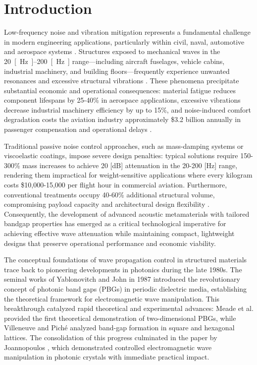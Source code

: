 \documentclass[review,numbers,sort&compress]{elsarticle}
\begin{document}
\section{Introduction}\label{intro}
Low-frequency noise and vibration mitigation represents a fundamental challenge in modern engineering applications, particularly within civil, naval, automotive and aerospace systems \cite{MIR2022108936, KANDASAMY2016279, RAO2003457, MASRI2024102957, Matlack2016, An2020, Comandini2024}. Structures exposed to mechanical waves in the \SIrange{20}{200}{[\hertz]} range---including aircraft fuselages, vehicle cabins, industrial machinery, and building floors---frequently experience unwanted resonances and excessive structural vibrations \cite{Lin2021, d2019fractal}. These phenomena precipitate substantial economic and operational consequences: material fatigue reduces component lifespans by 25-40\% in aerospace applications, excessive vibrations decrease industrial machinery efficiency by up to 15\%, and noise-induced comfort degradation costs the aviation industry approximately \$3.2 billion annually in passenger compensation and operational delays \cite{Hussein2014, Kinsler2000}. 

Traditional passive noise control approaches, such as mass-damping systems or viscoelastic coatings, impose severe design penalties: typical solutions require 150-300\% mass increases to achieve 20 [dB] attenuation in the 20-200 [Hz] range, rendering them impractical for weight-sensitive applications where every kilogram costs \$10,000-15,000 per flight hour in commercial aviation. Furthermore, conventional treatments occupy 40-60\% additional structural volume, compromising payload capacity and architectural design flexibility \cite{cryst10080686, Weiner2020,LU20131,Li2012}. Consequently, the development of advanced acoustic metamaterials with tailored bandgap properties has emerged as a critical technological imperative for achieving effective wave attenuation while maintaining compact, lightweight designs that preserve operational performance and economic viability.


The conceptual foundations of wave propagation control in structured materials trace back to pioneering developments in photonics during the late 1980s. The seminal works of Yablonovitch and John in 1987 \cite{Yablonovitch1987, John1987} introduced the revolutionary concept of photonic band gaps (PBGs) in periodic dielectric media, establishing the theoretical framework for electromagnetic wave manipulation. This breakthrough catalyzed rapid theoretical and experimental advances: Meade et al. \cite{Meade1992} provided the first theoretical demonstration of two-dimensional PBGs, while Villeneuve and Piché \cite{Villeneuve1992} analyzed band-gap formation in square and hexagonal lattices. The consolidation of this progress culminated in the paper by Joannopoulos \cite{Joannopoulos1997}, which demonstrated controlled electromagnetic wave manipulation in photonic crystals with immediate practical impact.
\end{document}

